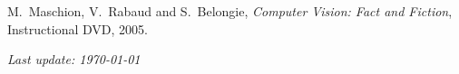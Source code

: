 \documentclass{article}
\begin{document}
\begin{llist}
M.~Maschion, V.~Rabaud and S.~Belongie, {\em Computer Vision: Fact and Fiction},
Instructional DVD, 2005.





\end{llist}

{\em Last update: \today}
\end{document}
